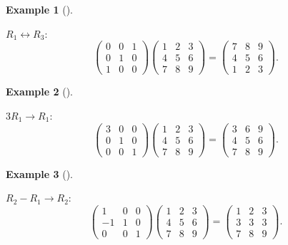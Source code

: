 \documentclass[
  a4paper,
  DIV=11,
  numbers=noendperiod,
  oneside]{scrreprt}
\theoremstyle{definition}
\newtheorem{example}{Example}[chapter]
\theoremstyle{remark}
\begin{document}
\begin{example}[]\protect\hypertarget{exm-}{}\label{exm-}

\(R_{1}\leftrightarrow R_{3}\):
\[\left(\begin{array}{ccc}0 & 0 & 1\\ 0 & 1 & 0 \\ 1 & 0 & 0\end{array}\right)\left(\begin{array}{ccc}1 & 2 & 3\\ 4 & 5 & 6 \\ 7 & 8 & 9\end{array}\right)
=\left(\begin{array}{ccc}7 & 8 & 9\\ 4 & 5 & 6 \\ 1 & 2 & 3\end{array}\right).\]

\end{example}

\begin{example}[]\protect\hypertarget{exm-}{}\label{exm-}

\(3R_{1}\rightarrow R_{1}\):
\[\left(\begin{array}{ccc}3 & 0 & 0\\ 0 & 1 & 0 \\ 0 & 0 & 1\end{array}\right)\left(\begin{array}{ccc}1 & 2 & 3\\ 4 & 5 & 6 \\ 7 & 8 & 9\end{array}\right)
=\left(\begin{array}{ccc}3 & 6 & 9\\ 4 & 5 & 6 \\ 7 & 8 & 9\end{array}\right).\]

\end{example}

\begin{example}[]\protect\hypertarget{exm-}{}\label{exm-}

\(R_{2}-R_{1}\rightarrow R_{2}\):
\[\left(\begin{array}{ccc}1 & 0 & 0\\ -1 & 1 & 0 \\ 0 & 0 & 1\end{array}\right)\left(\begin{array}{ccc}1 & 2 & 3\\ 4 & 5 & 6 \\ 7 & 8 & 9\end{array}\right)
=\left(\begin{array}{ccc}1 & 2 & 3\\ 3 & 3 & 3 \\ 7 & 8 & 9\end{array}\right).\]

\end{example}
\end{document}

